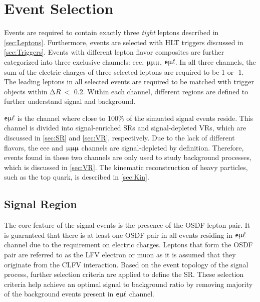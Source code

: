 \chapter{Event Selection}
\label{chap:Selection}

Events are required to contain exactly three \emph{tight} leptons described in \autoref{sec:Leptons}. Furthermore, events are selected with HLT triggers discussed in \autoref{sec:Triggers}. Events with different lepton flavor composites are further categorized into three exclusive channels: eee, $\upmu\upmu\upmu$, $\textsf{e}\upmu\ell$. In all three channels, the sum of the electric charges of three selected leptons are required to be 1 or -1. The leading leptons in all selected events are required to be matched with trigger objects within $\mathrm{\Delta} R~<$ 0.2. Within each channel, different regions are defined to further understand signal and background.

$\textsf{e}\upmu\ell$ is the channel where close to 100\% of the simuated signal events reside. This channel is divided into signal-enriched \acp{SR} and signal-depleted \acp{VR}, which are discussed in \autoref{sec:SR} and \autoref{sec:VR}, respectively. Due to the lack of different flavors, the eee and $\upmu\upmu\upmu$ channels are signal-depleted by definition. Therefore, events found in these two channels are only used to study background processes, which is discussed in \autoref{sec:VR}. The kinematic reconstruction of heavy particles, such as the top quark, is described in \autoref{sec:Kin}.
\section{Signal Region}
\label{sec:SR}

The core feature of the signal events is the presence of the \ac{OSDF} lepton pair. It is guaranteed that there is at least one \ac{OSDF} pair in all events residing in $\textsf{e}\upmu\ell$ channel due to the requirement on electric charges. Leptons that form the \ac{OSDF} pair are referred to as the LFV electron or muon as it is assumed that they originate from the \ac{CLFV} interaction. Based on the event topology of the signal process, further selection criteria are applied to define the \ac{SR}. These selection criteria help achieve an optimal signal to background ratio by removing majority of the background events present in $\textsf{e}\upmu\ell$ channel. 

